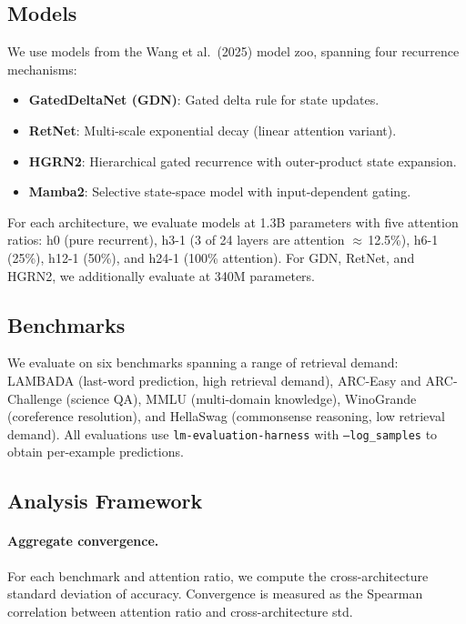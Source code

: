 \documentclass[11pt,a4paper]{article}
\begin{document}
\subsection{Models}

We use models from the Wang et al.\ (2025) model zoo, spanning four recurrence mechanisms:
\begin{itemize}
\item \textbf{GatedDeltaNet (GDN)}: Gated delta rule for state updates.
\item \textbf{RetNet}: Multi-scale exponential decay (linear attention variant).
\item \textbf{HGRN2}: Hierarchical gated recurrence with outer-product state expansion.
\item \textbf{Mamba2}: Selective state-space model with input-dependent gating.
\end{itemize}

For each architecture, we evaluate models at 1.3B parameters with five attention ratios: h0 (pure recurrent), h3-1 (3 of 24 layers are attention $\approx$\,12.5\%), h6-1 (25\%), h12-1 (50\%), and h24-1 (100\% attention).
For GDN, RetNet, and HGRN2, we additionally evaluate at 340M parameters.

\subsection{Benchmarks}

We evaluate on six benchmarks spanning a range of retrieval demand:
LAMBADA (last-word prediction, high retrieval demand),
ARC-Easy and ARC-Challenge (science QA),
MMLU (multi-domain knowledge),
WinoGrande (coreference resolution),
and HellaSwag (commonsense reasoning, low retrieval demand).
All evaluations use \texttt{lm-evaluation-harness} with \texttt{--log\_samples} to obtain per-example predictions.

\subsection{Analysis Framework}

\paragraph{Aggregate convergence.}
For each benchmark and attention ratio, we compute the cross-architecture standard deviation of accuracy.
Convergence is measured as the Spearman correlation between attention ratio and cross-architecture std.
\end{document}
